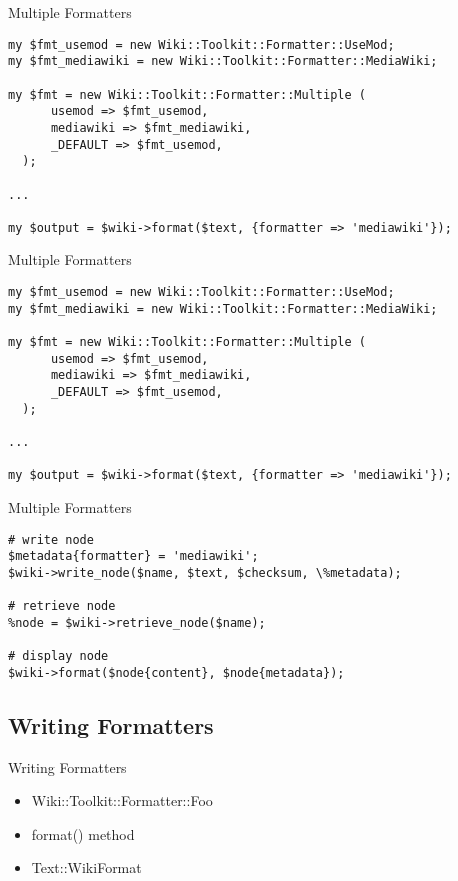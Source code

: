 \begin{frame}[fragile]{Multiple Formatters}
\begin{lstlisting}
my $fmt_usemod = new Wiki::Toolkit::Formatter::UseMod;
my $fmt_mediawiki = new Wiki::Toolkit::Formatter::MediaWiki;

my $fmt = new Wiki::Toolkit::Formatter::Multiple (
      usemod => $fmt_usemod,
      mediawiki => $fmt_mediawiki,
      _DEFAULT => $fmt_usemod,
  );

...

my $output = $wiki->format($text, {formatter => 'mediawiki'});
\end{lstlisting}
\end{frame}

\begin{frame}[fragile]{Multiple Formatters}
\begin{lstlisting}
my $fmt_usemod = new Wiki::Toolkit::Formatter::UseMod;
my $fmt_mediawiki = new Wiki::Toolkit::Formatter::MediaWiki;

my $fmt = new Wiki::Toolkit::Formatter::Multiple (
      usemod => $fmt_usemod,
      mediawiki => $fmt_mediawiki,
      _DEFAULT => $fmt_usemod,
  );

...

my $output = $wiki->format($text, {formatter => 'mediawiki'});
\end{lstlisting}
\end{frame}

\begin{frame}[fragile]{Multiple Formatters}
\begin{lstlisting}
# write node
$metadata{formatter} = 'mediawiki';
$wiki->write_node($name, $text, $checksum, \%metadata);

# retrieve node
%node = $wiki->retrieve_node($name);

# display node
$wiki->format($node{content}, $node{metadata});
\end{lstlisting}
\end{frame}

\subsection{Writing Formatters}


\begin{frame}{Writing Formatters}
 \begin{itemize}
   \item<1-> Wiki::Toolkit::Formatter::Foo
   \item<2-> format() method
   \item<3-> Text::WikiFormat
 \end{itemize}
\end{frame}

